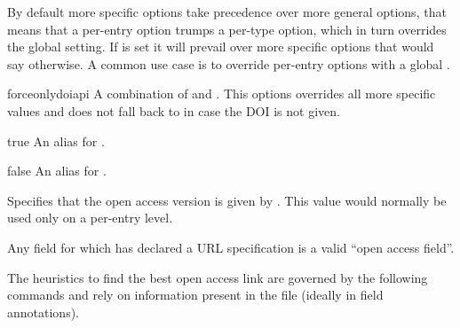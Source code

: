 \documentclass[DIV=9]{scrartcl}
\begin{document}
\begin{optionlist}
\begin{valuelist}
  By default more specific options take precedence over more general options,
  that means that a per-entry option trumps a per-type option, which in turn
  overrides the global setting.
  If  is set it will prevail over more specific options that
  would say otherwise. A common use case is to override per-entry options with
  a global .

\item[forceonlydoiapi] A combination of  and
  .
  This options overrides all more specific values and does not fall back to
   in case the DOI is not given.

\item[true] An alias for .
\item[false] An alias for .

\item[\prm{open access field}] Specifies that the open access version is given
  by .
  This value would normally be used only on a per-entry level.

  Any field for which  has declared a URL
  specification is a valid \enquote{open access field}.
\end{valuelist}

\end{optionlist}

The heuristics to find the best open access link are governed
by the following commands and rely on information present in the 
file (ideally in field annotations).
\end{document}
